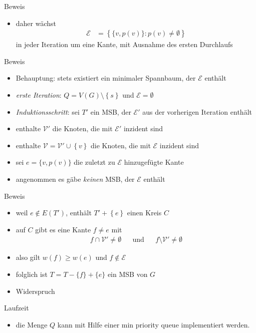 \documentclass[aspectratio=1610, 11pt]{beamer}
\newcommand\cE{\mathcal E}
\newcommand\cV{\mathcal V}
\newcommand\cbc[1]{\left\{{#1}\right\}}
\begin{document}
\begin{frame}
\begin{overprint}
\begin{exampleblock}{Beweis}
\begin{itemize}
		\item daher w\"achst 
	\begin{align*}
		\cE&=\cbc{\{v,p(v)\}:p(v)\neq\emptyset}
	\end{align*}
			in jeder Iteration um eine Kante, mit Ausnahme des ersten Durchlaufs
	\end{itemize}
\end{exampleblock}
\begin{exampleblock}{Beweis}
	\begin{itemize}
		\item \alert{Behauptung:} stets existiert ein minimaler Spannbaum, der $\cE$ enth\"alt
		\item {\em erste Iteration}: $Q=V(G)\setminus\cbc s$ und $\cE=\emptyset$
		\item {\em Induktionsschritt}: sei $T'$ ein MSB, der $\cE'$ aus der vorherigen Iteration enth\"alt
		\item enthalte $\cV'$ die Knoten, die mit $\cE'$ inzident sind
		\item enthalte $\cV=\cV'\cup\cbc v$ die Knoten, die mit $\cE$ inzident sind
		\item sei $e=\{v,p(v)\}$ die zuletzt zu $\cE$ hinzugef\"ugte Kante
		\item angenommen es g\"abe \emph{keinen} MSB, der $\cE$ enth\"alt
	\end{itemize}
\end{exampleblock}
\begin{exampleblock}{Beweis}
	\begin{itemize}
		\item weil $e\not\in E(T')$, enth\"alt $T'+\cbc e$ einen Kreis $C$
		\item auf $C$ gibt es eine Kante $f\neq e$ mit
			\begin{align*}
				f\cap\cV'\neq\emptyset&&\mbox{und}&&f\setminus\cV'\neq\emptyset
			\end{align*}
		\item also gilt $w(f)\geq w(e)$ und $f\not\in\cE$
		\item folglich ist $T=T-\{f\}+\{e\}$ ein MSB von $G$
		\item Widerspruch
	\end{itemize}
\end{exampleblock}
\begin{exampleblock}{Laufzeit}
	\begin{itemize}
		\item die Menge $Q$ kann mit Hilfe einer min priority queue implementiert werden.

\end{itemize}
\end{exampleblock}
\end{overprint}
\end{frame}
\end{document}
